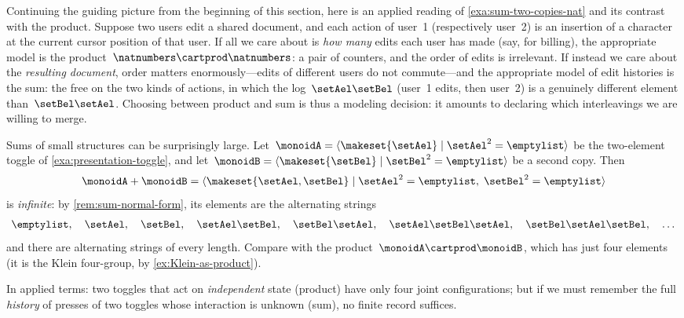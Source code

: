 \begin{example}
    \label{exa:sum-two-editors}
    Continuing the guiding picture from the beginning of this section, here is an applied reading of \cref{exa:sum-two-copies-nat} and its contrast with the product.
    Suppose two users edit a shared document, and each action of user~1 (respectively user~2) is an insertion of a character at the current cursor position of that user.
    If all we care about is \emph{how many} edits each user has made (say, for billing), the appropriate model is the product~$\natnumbers \cartprod \natnumbers$: a pair of counters, and the order of edits is irrelevant.
    If instead we care about the \emph{resulting document}, order matters enormously---edits of different users do not commute---and the appropriate model of edit histories is the sum: the free  on the two kinds of actions, in which the log~$\setAel\setBel$ (user~1 edits, then user~2) is a genuinely different element than~$\setBel\setAel$.
    Choosing between product and sum is thus a modeling decision: it amounts to declaring which interleavings we are willing to merge.
\end{example}

\begin{example}
    \label{exa:sum-two-toggles}
    Sums of small structures can be surprisingly large.
    Let~$\monoidA = \langle \makeset{\setAel} \mid \setAel^2 = \emptylist \rangle$ be the two-element toggle  of \cref{exa:presentation-toggle}, and let~$\monoidB = \langle \makeset{\setBel} \mid \setBel^2 = \emptylist \rangle$ be a second copy.
    Then
    \begin{equation}
        \monoidA + \monoidB = \langle \makeset{\setAel, \setBel} \mid \setAel^2 = \emptylist, \; \setBel^2 = \emptylist \rangle
    \end{equation}
    is \emph{infinite}: by \cref{rem:sum-normal-form}, its elements are the alternating strings
    \begin{equation}
        \emptylist, \quad \setAel, \quad \setBel, \quad \setAel\setBel, \quad \setBel\setAel, \quad \setAel\setBel\setAel, \quad \setBel\setAel\setBel, \quad \dots
    \end{equation}
    and there are alternating strings of every length.
    Compare with the product~$\monoidA \cartprod \monoidB$, which has just four elements (it is the Klein four-group, by \cref{ex:Klein-as-product}).

    In applied terms: two toggles that act on \emph{independent} state (product) have only four joint configurations; but if we must remember the full \emph{history} of presses of two toggles whose interaction is unknown (sum), no finite record suffices.
\end{example}

